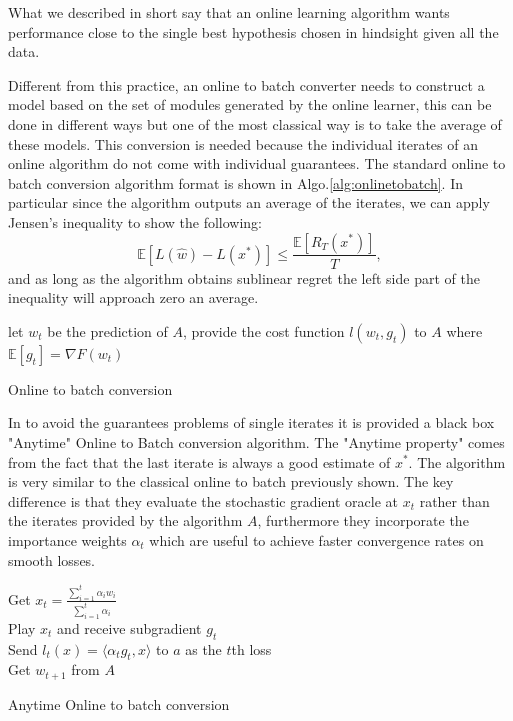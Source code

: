 \documentclass[12pt]{article}
\theoremstyle{definition}
\begin{document}
What we described in short say that an online learning algorithm wants performance close to the single best hypothesis chosen in hindsight given all the data.

Different from this practice, an online to batch converter needs to construct a model based on the set of modules generated by the online learner, this can be done in different ways but one of the most classical way is to take the average of these models. This conversion is needed because the individual iterates of an online algorithm do not come with individual guarantees. The standard online to batch conversion algorithm format is shown in Algo.\ref{alg:onlinetobatch}. In particular since the algorithm outputs an average of the iterates, we can apply Jensen's inequality to show the following:
$$
\mathbb{E}[L(\hat w) - L(x^*)] \leq \frac{\mathbb{E}[R_T(x^*)]}{T}, 
$$
and as long as the algorithm obtains sublinear regret the left side part of the inequality will approach zero an average.

\begin{algorithm}

      {
		let $w_t$ be the prediction of $A$, provide the cost function $l(w_t,g_t)$ to $A$
		where $\mathbb{E}[g_t] = \nabla F(w_t)$
      }
    \caption{Online to batch conversion }
    \label{alg:onlinetobatch}
\end{algorithm}

In \cite{cutkosky} to avoid the guarantees problems of single iterates it is provided a black box "Anytime" Online to Batch conversion algorithm. The "Anytime property" comes from the fact that the last iterate is always a good estimate of $x^*$. The algorithm is very similar to the classical online to batch previously shown. The key difference is that they evaluate the stochastic gradient oracle at $x_t$ rather than the iterates provided by the algorithm $A$, furthermore they incorporate the importance weights $\alpha_t$ which are useful to achieve faster convergence rates on smooth losses. 

\begin{algorithm}

      {
		Get $x_t = \frac{\sum_{i=1}^t \alpha_i w_i}{\sum_{i=1}^t \alpha_i} $ \\
		Play $x_t$ and receive subgradient $g_t$ \\
		Send $l_t(x) = \langle \alpha_t g_t,x\rangle$ to $a$ as the $t$th loss \\
		Get $w_{t+1}$ from $A$
      }
    \caption{Anytime Online to batch conversion }
    \label{alg:anytime}
\end{algorithm}
\end{document}
